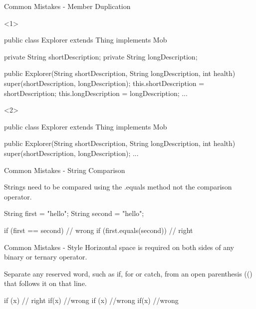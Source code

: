 \documentclass[12]{beamer}
\begin{document}
\begin{frame}[t, fragile]{Common Mistakes - Member Duplication} \vspace{4pt}

\begin{onlyenv}<1>
\begin{java}
public class Explorer extends Thing implements Mob {

    private String shortDescription;
    private String longDescription;

    public Explorer(String shortDescription, String longDescription, int health) {
        super(shortDescription, longDescription);
        this.shortDescription = shortDescription;
        this.longDescription = longDescription;
        ...
    }
}
\end{java}
\end{onlyenv}

\begin{onlyenv}<2>
\begin{java}
public class Explorer extends Thing implements Mob {

    public Explorer(String shortDescription, String longDescription, int health) {
        super(shortDescription, longDescription);
        ...
    }
}
\end{java}
\end{onlyenv}

\end{frame}

\begin{frame}[t, fragile]{Common Mistakes - String Comparison} \vspace{4pt}

Strings need to be compared using the .equals method not the comparison operator.

\begin{java}
String first = "hello";
String second = "hello";

if (first == second) {} // wrong
if (first.equals(second)) {} // right
\end{java}

\end{frame}

\begin{frame}[t, fragile]{Common Mistakes - Style} \vspace{4pt}
Horizontal space is required on both sides of any binary or ternary operator.

Separate any reserved word, such as if, for or catch, from an open parenthesis (() that follows it on that line.

\begin{java}
if (x) {} // right
if(x){} //wrong
if (x){} //wrong
if(x) {} //wrong
\end{java}

\end{frame}
\end{document}
